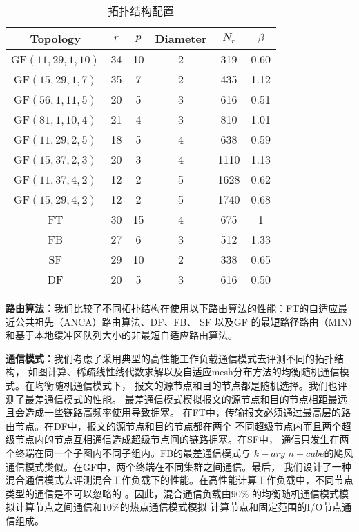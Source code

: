 \begin{table}[t]
\caption{拓扑结构配置}
\centering
\begin{tabular}{c| c| c|c| c |c}\hline
  \centering
  Topology	& $r$ &$p$ &Diameter & $N_r$ 	& $\beta$	\\\hline
  GF$(11,29,1,10)$ &34 &10 &2	&319 		&0.60	\\\hline
  GF$(15,29,1,7)$ &35 &7 &2	&435 		&1.12 \\\hline
  GF$(56,1,11,5)$ &20 &5 &3	&616 		&0.51 \\\hline
  GF$(81,1,10,4)$ &21 &4 &3	&810 	&1.01 \\\hline
  GF$(11,29,2,5)$ &18 &5 &4	&638 		&0.59 \\\hline
  GF$(15,37,2,3)$ &20 &3 &4	&1110 		&1.13 \\\hline
  GF$(11,37,4,2)$ &12 &2 &5	&1628 		&0.62 \\\hline
  GF$(15,29,4,2)$ &12 &2 &5	&1740 		&0.68 \\\hline
  FT &30 &15 &4	&675		&1	\\\hline
  FB &27 &6	  &3 &512		&1.33 \\\hline
  SF &29 &10 &2	&338		&0.65 \\\hline
  DF &20 &5	&3 &616		&0.50 \\\hline
\end{tabular}
  \label{Table6}
\end{table}

\textbf{路由算法：}我们比较了不同拓扑结构在使用以下路由算法的性能：FT的自适应最近公共祖先（ANCA）路由算法、DF、FB、 SF 以及GF 的最短路径路由（MIN）和基于本地缓冲区队列大小的非最短自适应路由算法。

\textbf{通信模式：}我们考虑了采用典型的高性能工作负载通信模式去评测不同的拓扑结构，
如图计算、稀疏线性线代数求解以及自适应mesh分布方法的均衡随机通信模式。在均衡随机通信模式下，
报文的源节点和目的节点都是随机选择。我们也评测了最差通信模式的性能。
最差通信模式模拟报文的源节点和目的节点相距最远且会造成一些链路高频率使用导致拥塞。
在FT中，传输报文必须通过最高层的路由节点。在DF中，报文的源节点和目的节点都在两个
不同超级节点内而且两个超级节点内的节点互相通信造成超级节点间的链路拥塞。在SF中，
通信只发生在两个终端在同一个子图内不同子组内。FB的最差通信模式与
$k-ary$ $n-cube$的飓风通信模式类似。在GF中，两个终端在不同集群之间通信。最后，
我们设计了一种混合通信模式去评测混合工作负载下的性能。在高性能计算工作负载中，不同节点类型的通信是不可以忽略的 。因此，混合通信负载由$90\%$
的均衡随机通信模式模拟计算节点之间通信和$10\%$的热点通信模式模拟
计算节点和固定范围的I/O节点通信组成。

